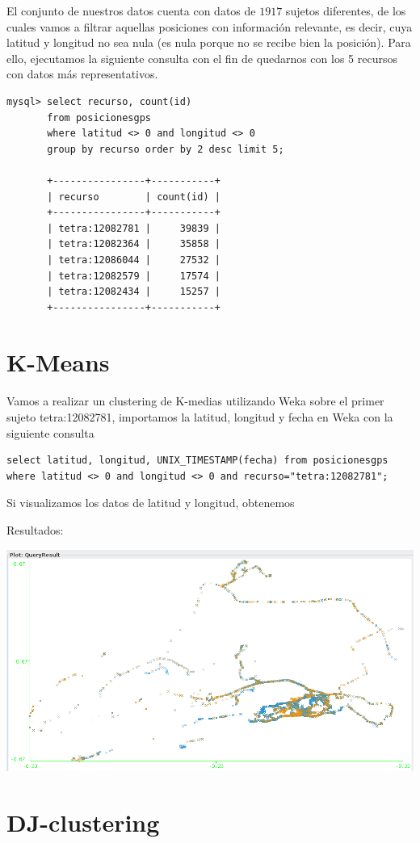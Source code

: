\documentclass[a4paper,12pt]{article}
\begin{document}
El conjunto de nuestros datos cuenta con datos de $1917$ sujetos diferentes, de los cuales vamos a filtrar aquellas posiciones con informaci\'on relevante, es decir, cuya latitud y longitud no sea nula (es nula porque no se recibe bien la posici\'on). Para ello, ejecutamos la siguiente consulta con el fin de quedarnos con los 5 recursos con datos m\'as representativos. 

\begin{lstlisting}
mysql> select recurso, count(id) 
	   from posicionesgps 
	   where latitud <> 0 and longitud <> 0 
	   group by recurso order by 2 desc limit 5;
	   
	   +----------------+-----------+
	   | recurso        | count(id) |
	   +----------------+-----------+
	   | tetra:12082781 |     39839 |
	   | tetra:12082364 |     35858 |
	   | tetra:12086044 |     27532 |
	   | tetra:12082579 |     17574 |
	   | tetra:12082434 |     15257 |
	   +----------------+-----------+

\end{lstlisting}


\section{K-Means}

Vamos a realizar un clustering de K-medias utilizando Weka sobre el primer sujeto tetra:12082781, importamos la latitud, longitud y fecha en Weka con la siguiente consulta

\begin{lstlisting}
select latitud, longitud, UNIX_TIMESTAMP(fecha) from posicionesgps 
where latitud <> 0 and longitud <> 0 and recurso="tetra:12082781";
\end{lstlisting}

Si visualizamos los datos de latitud y longitud, obtenemos

Resultados: 

\includegraphics[scale=.5]{tetra:12082781.png}

\section{DJ-clustering}
\end{document}
